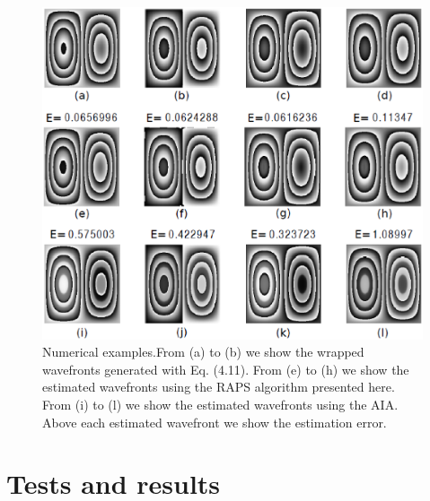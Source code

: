 \begin{figure}[th!]
	\begin{center}
		\includegraphics[scale=0.4]{Chpt3_figures/fig_1.eps}
	\end{center}
	\caption{Numerical examples.From (a) to (b) we show the wrapped
	wavefronts generated with Eq. (4.11). From (e) to (h) we show the
	estimated wavefronts using the RAPS algorithm presented here. From
	(i) to (l) we show the estimated wavefronts using the AIA. Above each
	estimated wavefront we show the estimation error.} 
	\label{fig:SimPhaseComparisonRAPS}
\end{figure}

\section{Tests and results}

